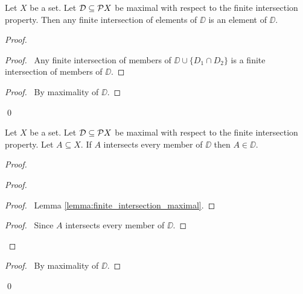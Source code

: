 \begin{lemma}
    \label{lemma:finite_intersection_maximal}
    Let $X$ be a set. Let $\mathcal{D} \subseteq \mathcal{P} X$ be maximal with respect to the finite intersection property.
    Then any finite intersection of elements of $\DD$ is an element of $\DD$.
\end{lemma}

\begin{proof}
    \pf
    \begin{proof}
        \pf\ Any finite intersection of members of $\DD \cup \{ D_1 \cap D_2 \}$
        is a finite intersection of members of $\DD$.
    \end{proof}
    \begin{proof}
        \pf\ By maximality of $\DD$.
    \end{proof}
    \qed
\end{proof}

\begin{lemma}
    \label{lemma:member_maximal_finite_intersection}
    Let $X$ be a set. Let $\mathcal{D} \subseteq \mathcal{P} X$ be maximal with respect to the finite intersection property.
    Let $A \subseteq X$. If $A$ intersects every member of $\DD$ then $A \in \DD$.
\end{lemma}

\begin{proof}
    \pf
    \begin{proof}
        \begin{proof}
            \pf\ Lemma \ref{lemma:finite_intersection_maximal}.
        \end{proof}
        \begin{proof}
            \pf\ Since $A$ intersects every member of $\DD$.
        \end{proof}
    \end{proof}
    \qedstep
    \begin{proof}
        \pf\ By maximality of $\DD$.
    \end{proof}
    \qed
\end{proof}

